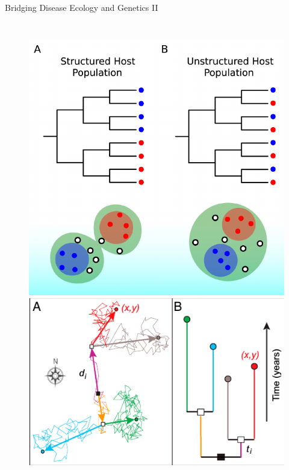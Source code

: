 \begin{frame}{Bridging Disease Ecology and Genetics II}
\begin{columns}
\column{2.5in}
\begin{figure}[!h]
\begin{center}
\includegraphics[scale=.23]{FIGURES/pop_structure.jpg} \\
\includegraphics[scale=.4]{FIGURES/bmotion_phylo.jpg}
\end{center}
\end{figure}
\column{2.5in}

\end{columns}
\end{frame}
